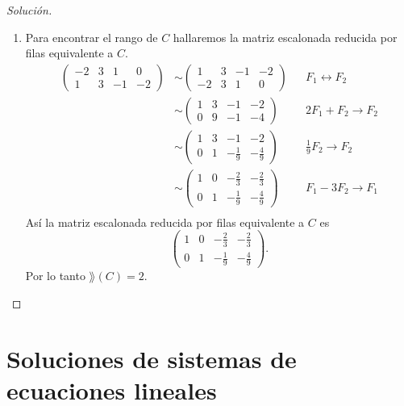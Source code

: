 \documentclass[a4,11pt]{aleph-notas}
\begin{document}
\begin{proof}[Solución]
\begin{enumerate}
    \item Para encontrar el rango de $C$ hallaremos la matriz escalonada reducida por filas equivalente a $C$.
        \begin{align*}
            \begin{pmatrix}
            -2 & 3 & 1 &0\\
            1 & 3 & -1 & -2
            \end{pmatrix} 
            & \sim
            \begin{pmatrix}
            1 & 3 & -1 & -2\\
            -2 & 3 & 1 &0
            \end{pmatrix} &&
            F_1 \leftrightarrow F_2\\
            & \sim
            \begin{pmatrix}
            1 & 3 & -1 & -2\\
            0 & 9 & -1 & -4
            \end{pmatrix} &&
            2F_1 + F_2 \to F_2\\     
            & \sim
            \begin{pmatrix}
            1 & 3 & -1 & -2\\
            0 & 1 & -\frac{1}{9} & -\frac{4}{9}
            \end{pmatrix} &&
            \frac{1}{9}F_2 \to F_2\\ 
            & \sim
            \begin{pmatrix}
            1 & 0 & -\frac{2}{3} & -\frac{2}{3}\\
            0 & 1 & -\frac{1}{9} & -\frac{4}{9}
            \end{pmatrix} &&
            F_1 - 3F_2 \to F_1\\   
         \end{align*}
    Así la matriz escalonada reducida por filas equivalente a $C$ es
        \[
            \begin{pmatrix}
            1 & 0 & -\frac{2}{3} & -\frac{2}{3}\\
            0 & 1 & -\frac{1}{9} & -\frac{4}{9}
            \end{pmatrix} .           
        \]
    Por lo tanto $\rang(C)=2$.
    \end{enumerate}
\end{proof}

\section{Soluciones de sistemas de ecuaciones lineales}
\end{document}
